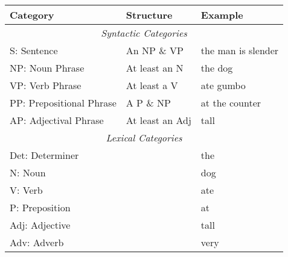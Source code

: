 \begin{tabular}{l l l}
  \textbf{Category}         & \textbf{Structure}  & \textbf{Example} \\
  \hline
  \multicolumn{3}{c}{\emph{Syntactic Categories}} \\
  S: Sentence               & An NP \& VP         & the man is slender \\
  NP: Noun Phrase           & At least an N       & the dog \\
  VP: Verb Phrase           & At least a V        & ate gumbo \\
  PP: Prepositional Phrase  & A P \& NP           & at the counter \\
  AP: Adjectival Phrase     & At least an Adj     & tall \\
  \multicolumn{3}{c}{\emph{Lexical Categories}} \\
  Det: Determiner           &                     & the \\
  N: Noun                   &                     & dog \\
  V: Verb                   &                     & ate \\
  P: Preposition            &                     & at \\
  Adj: Adjective            &                     & tall \\
  Adv: Adverb               &                     & very
\end{tabular}
